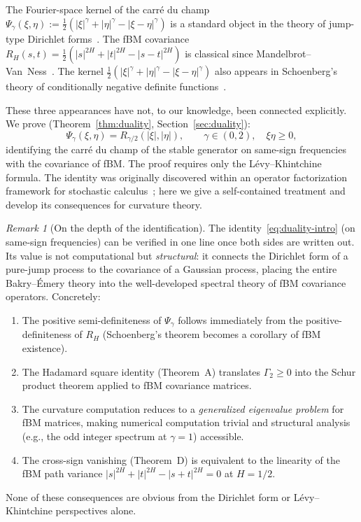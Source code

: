 \documentclass[11pt,a4paper]{article}
\theoremstyle{plain}
\theoremstyle{definition}
\theoremstyle{remark}
\newtheorem{remark}[theorem]{Remark}
\begin{document}
The Fourier-space kernel of the carr\'e du champ
$\Psi_\gamma(\xi,\eta) :=
\frac{1}{2}(|\xi|^\gamma + |\eta|^\gamma - |\xi-\eta|^\gamma)$
is a standard object in the theory of jump-type Dirichlet
forms~\cite{BoettcherSchillingWang2013}.
The fBM covariance $R_H(s,t) = \frac{1}{2}(|s|^{2H} + |t|^{2H}
- |s-t|^{2H})$ is classical since
Mandelbrot--Van~Ness~\cite{Mishura2008}.
The kernel $\frac{1}{2}(|\xi|^\gamma + |\eta|^\gamma
- |\xi-\eta|^\gamma)$ also appears in Schoenberg's
theory of conditionally negative definite
functions~\cite{Schoenberg1938}.

These three appearances have not, to our knowledge, been connected
explicitly.  We prove (Theorem~\ref{thm:duality},
Section~\ref{sec:duality}):
\begin{equation}\label{eq:duality-intro}
  \Psi_\gamma(\xi,\eta) = R_{\gamma/2}(|\xi|,|\eta|),
  \qquad \gamma \in (0,2),\quad \xi\eta \geq 0,
\end{equation}
identifying the carr\'e du champ of the stable generator on
same-sign frequencies with the covariance of fBM.  The proof
requires only the L\'evy--Khintchine formula.
The identity was originally discovered within an operator
factorization framework for stochastic
calculus~\cite{Fontes2026a}; here we give a self-contained
treatment and develop its consequences for curvature theory.

\begin{remark}[On the depth of the identification]
\label{rem:identification}
The identity~\eqref{eq:duality-intro} (on same-sign frequencies)
can be verified
in one line once both sides are written out. Its value
is not computational but \emph{structural}: it connects
the Dirichlet form of a pure-jump process to the
covariance of a Gaussian process, placing the entire
Bakry--\'Emery theory into the well-developed spectral
theory of fBM covariance operators. Concretely:
\begin{enumerate}[label=(\alph*)]
\item The positive semi-definiteness of $\Psi_\gamma$
  follows immediately from the positive-definiteness
  of $R_H$ (Schoenberg's theorem becomes a
  corollary of fBM existence).
\item The Hadamard square identity (Theorem~A)
  translates $\Gamma_2 \geq 0$ into the Schur product
  theorem applied to fBM covariance matrices.
\item The curvature computation reduces to a
  \emph{generalized eigenvalue problem} for fBM
  matrices, making numerical computation trivial
  and structural analysis (e.g., the odd integer
  spectrum at $\gamma = 1$) accessible.
\item The cross-sign vanishing (Theorem~D) is
  equivalent to the linearity of the fBM path
  variance $|s|^{2H} + |t|^{2H} - |s+t|^{2H} = 0$
  at $H = 1/2$.
\end{enumerate}
None of these consequences are obvious from the
Dirichlet form or L\'evy--Khintchine perspectives alone.
\end{remark}
\end{document}
